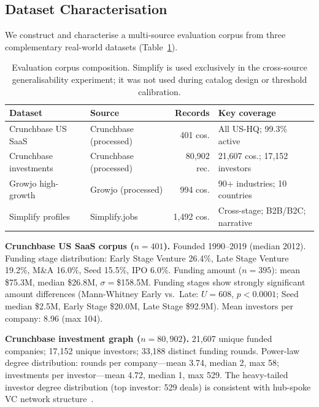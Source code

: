\documentclass[preprint,12pt]{elsarticle}
\begin{document}
\subsection{Dataset Characterisation}
\label{sec:datasets}

We construct and characterise a multi-source evaluation corpus from three
complementary real-world datasets (Table~\ref{tab:corpus}).

\begin{table}[t]
\centering
\caption{Evaluation corpus composition. Simplify is used exclusively in the
  cross-source generalisability experiment; it was not used during catalog
  design or threshold calibration.}
\label{tab:corpus}
\begin{tabularx}{\columnwidth}{lXrX}
\toprule
\textbf{Dataset} & \textbf{Source} & \textbf{Records} & \textbf{Key coverage} \\
\midrule
Crunchbase US SaaS      & Crunchbase (processed) & 401 cos.    & All US-HQ; 99.3\% active \\
Crunchbase investments  & Crunchbase (processed) & 80,902 rec. & 21,607 cos.; 17,152 investors \\
Growjo high-growth      & Growjo (processed)     & 994 cos.    & 90+ industries; 10 countries \\
Simplify profiles       & Simplify.jobs          & 1,492 cos.  & Cross-stage; B2B/B2C; narrative \\
\bottomrule
\end{tabularx}
\end{table}

\textbf{Crunchbase US SaaS corpus ($n{=}401$).} Founded 1990--2019 (median 2012).
Funding stage distribution: Early Stage Venture 26.4\%, Late Stage Venture 19.2\%,
M\&A 16.0\%, Seed 15.5\%, IPO 6.0\%. Funding amount ($n{=}395$): mean \$75.3M,
median \$26.8M, $\sigma{=}$\$158.5M. Funding stages show strongly significant
amount differences (Mann-Whitney Early vs.\ Late: $U{=}608$, $p{<}0.0001$; Seed
median \$2.5M, Early Stage \$20.0M, Late Stage \$92.9M). Mean investors per
company: 8.96 (max 104).

\textbf{Crunchbase investment graph ($n{=}80{,}902$).} 21,607 unique funded
companies; 17,152 unique investors; 33,188 distinct funding rounds. Power-law
degree distribution: rounds per company---mean 3.74, median 2, max 58; investments
per investor---mean 4.72, median 1, max 529. The heavy-tailed investor degree
distribution (top investor: 529 deals) is consistent with hub-spoke VC network
structure~\cite{hochberg2007whom}.
\end{document}
